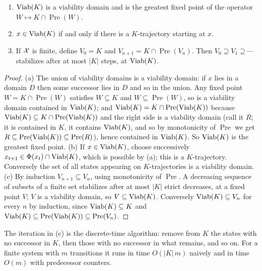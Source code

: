 \begin{established}\label{thm:kernel}
\begin{enumerate}[nosep,label=(\alph*)]
  \item $\operatorname{Viab}(K)$ is a viability domain and is the greatest fixed point of the operator $W\mapsto K\cap\operatorname{Pre}(W)$.
  \item $x\in\operatorname{Viab}(K)$ if and only if there is a $K$-trajectory starting at $x$.
  \item If $\mathcal{X}$ is finite, define $V_0=K$ and $V_{n+1}=K\cap\operatorname{Pre}(V_n)$. Then $V_0\supseteq V_1\supseteq\cdots$ stabilizes after at most $|K|$ steps, at $\operatorname{Viab}(K)$.
\end{enumerate}
\end{established}
\begin{proof}
(a) The union of viability domains is a viability domain: if $x$ lies in a domain $D$ then some successor lies in $D$ and so in the union. Any fixed point $W=K\cap\operatorname{Pre}(W)$ satisfies $W\subseteq K$ and $W\subseteq\operatorname{Pre}(W)$, so is a viability domain contained in $\operatorname{Viab}(K)$; and $\operatorname{Viab}(K)=K\cap\operatorname{Pre}(\operatorname{Viab}(K))$ because $\operatorname{Viab}(K)\subseteq K\cap\operatorname{Pre}(\operatorname{Viab}(K))$ and the right side is a viability domain (call it $R$; it is contained in $K$, it contains $\operatorname{Viab}(K)$, and so by monotonicity of $\operatorname{Pre}$ we get $R\subseteq\operatorname{Pre}(\operatorname{Viab}(K))\subseteq\operatorname{Pre}(R)$), hence contained in $\operatorname{Viab}(K)$. So $\operatorname{Viab}(K)$ is the greatest fixed point.
(b) If $x\in\operatorname{Viab}(K)$, choose successively $x_{t+1}\in\Phi(x_t)\cap\operatorname{Viab}(K)$, which is possible by (a); this is a $K$-trajectory. Conversely the set of all states appearing on $K$-trajectories is a viability domain.
(c) By induction $V_{n+1}\subseteq V_n$, using monotonicity of $\operatorname{Pre}$. A decreasing sequence of subsets of a finite set stabilizes after at most $|K|$ strict decreases, at a fixed point $V$; $V$ is a viability domain, so $V\subseteq\operatorname{Viab}(K)$. Conversely $\operatorname{Viab}(K)\subseteq V_n$ for every $n$ by induction, since $\operatorname{Viab}(K)\subseteq K$ and $\operatorname{Viab}(K)\subseteq\operatorname{Pre}(\operatorname{Viab}(K))\subseteq\operatorname{Pre}(V_n)$.
\end{proof}

The iteration in (c) is the discrete-time algorithm: remove from $K$ the states with no successor in $K$, then those with no successor in what remains, and so on. For a finite system with $m$ transitions it runs in time $O(|K|\,m)$ naively and in time $O(m)$ with predecessor counters.

